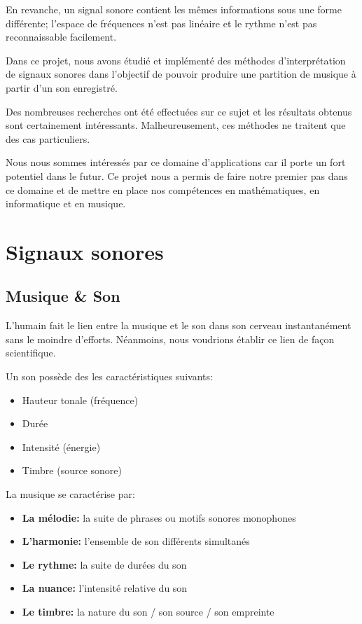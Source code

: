 \documentclass[french,]{article}
\providecommand{\tightlist}{%
  \setlength{\itemsep}{0pt}\setlength{\parskip}{0pt}}
\begin{document}
En revanche, un signal sonore contient les mêmes informations sous une
forme différente; l'espace de fréquences n'est pas linéaire et le rythme
n'est pas reconnaissable facilement.

Dans ce projet, nous avons étudié et implémenté des méthodes
d'interprétation de signaux sonores dans l'objectif de pouvoir produire
une partition de musique à partir d'un son enregistré.

Des nombreuses recherches ont été effectuées sur ce sujet et les
résultats obtenus sont certainement intéressants. Malheureusement, ces
méthodes ne traitent que des cas particuliers.

Nous nous sommes intéressés par ce domaine d'applications car il porte
un fort potentiel dans le futur. Ce projet nous a permis de faire notre
premier pas dans ce domaine et de mettre en place nos compétences en
mathématiques, en informatique et en musique.

\pagebreak

\hypertarget{signaux-sonores}{%
\section{Signaux sonores}\label{signaux-sonores}}

\hypertarget{musique-son}{%
\subsection{Musique \& Son}\label{musique-son}}

L'humain fait le lien entre la musique et le son dans son cerveau
instantanément sans le moindre d'efforts. Néanmoins, nous voudrions
établir ce lien de façon scientifique.

Un son possède des les caractéristiques suivants:

\begin{itemize}
\tightlist
\item
  Hauteur tonale (fréquence)
\item
  Durée
\item
  Intensité (énergie)
\item
  Timbre (source sonore)
\end{itemize}

La musique se caractérise par:

\begin{itemize}
\tightlist
\item
  \textbf{La mélodie:} la suite de phrases ou motifs sonores monophones
\item
  \textbf{L'harmonie:} l'ensemble de son différents simultanés
\item
  \textbf{Le rythme:} la suite de durées du son
\item
  \textbf{La nuance:} l'intensité relative du son
\item
  \textbf{Le timbre:} la nature du son / son source / son empreinte
\end{itemize}
\end{document}
